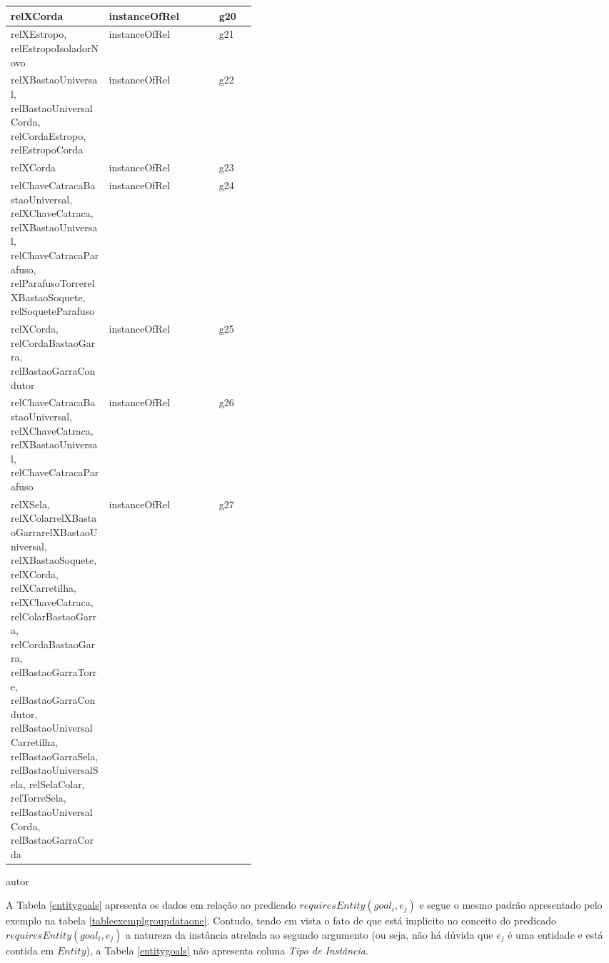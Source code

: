 \begin{center}
\begin{longtable}[H]{|p{0.4\linewidth}|l|l|}
relXCorda                                                                                                       									& instanceOfRel              		 & g20        \\ \hline
relXEstropo, relEstropoIsoladorNovo                                                                              									& instanceOfRel              		 & g21        \\ \hline
relXBastaoUniversal, relBastaoUniversalCorda, relCordaEstropo, relEstropoCorda                                     									& instanceOfRel              		 & g22        \\ \hline
relXCorda                                                                                                       									& instanceOfRel              		 & g23        \\ \hline
relChaveCatracaBastaoUniversal, relXChaveCatraca, relXBastaoUniversal, relChaveCatracaParafuso, relParafusoTorrerelXBastaoSoquete, relSoqueteParafuso 	& instanceOfRel						 & g24        \\ \hline
relXCorda, relCordaBastaoGarra, relBastaoGarraCondutor                                                            									& instanceOfRel						 & g25        \\ \hline
relChaveCatracaBastaoUniversal, relXChaveCatraca, relXBastaoUniversal, relChaveCatracaParafuso                     									& instanceOfRel						 & g26        \\ \hline
relXSela, relXColarrelXBastaoGarrarelXBastaoUniversal, relXBastaoSoquete, relXCorda, relXCarretilha, relXChaveCatraca, relColarBastaoGarra, relCordaBastaoGarra, relBastaoGarraTorre, relBastaoGarraCondutor, relBastaoUniversalCarretilha, relBastaoGarraSela, relBastaoUniversalSela, relSelaColar, relTorreSela, relBastaoUniversalCorda, relBastaoGarraCorda 									& instanceOfRel						 & g27  \\ \hline

\end{longtable}
autor
\end{center}

A Tabela \ref{entitygoals} apresenta os dados em relação ao predicado $requiresEntity(goal_i, e_j)$ e segue o mesmo padrão apresentado pelo exemplo na tabela \ref{tableexemplgroupdataone}. Contudo, tendo em vista o fato de que está implicito no conceito do predicado $requiresEntity(goal_i, e_j)$ a natureza da instância atrelada ao segundo argumento (ou seja, não há dúvida que $e_j$ é uma entidade e está contida em $Entity$), a Tabela \ref{entitygoals} não apresenta coluna \textit{Tipo de Instância}.

